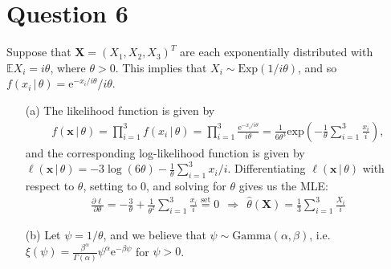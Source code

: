 \documentclass[10pt]{article}
\begin{document}
\section{Question 6} \noindent
Suppose that \(\bm{X} = (X_1, X_2, X_3)^T\) are each exponentially distributed with \(\mathbb{E}X_i = i\theta\), where \(\theta > 0\). This implies that 
\(X_i \sim \mathrm{Exp}(1 / i\theta)\), and so \(f(x_i \,|\, \theta) = \mathrm{e}^{-x_i / i\theta} / i\theta\). 
\begin{itemize}
    \item[(a)] The likelihood function is given by 
    \begin{align*}
        f(\mathbf{x} \,|\, \theta)
        = \prod_{i=1}^3 f(x_i \,|\, \theta)
        = \prod_{i=1}^3 \frac{\mathrm{e}^{-x_i / i\theta}}{i \theta}
        = \frac{1}{6 \theta^3} \mathrm{exp} \left( - \frac{1}{\theta} \sum_{i=1}^3 \frac{x_i}{i} \right),
    \end{align*}
    and the corresponding log-likelihood function is given by 
    \(\ell(\mathbf{x} \,|\, \theta) = -3 \log (6 \theta) - \frac{1}{\theta} \sum_{i=1}^3 x_i / i.\)
    Differentiating \(\ell(\mathbf{x} \,|\, \theta)\) with respect to \(\theta\), setting to 0, and solving for \(\theta\) gives us the MLE:
    \begin{align*}
        \frac{\partial \ell}{\partial \theta}  
        = - \frac{3}{\theta} + \frac{1}{\theta^2} \sum_{i=1}^3 \frac{x_i}{i} 
        \overset{\text{set}}{=} 0
        ~~\Longrightarrow~~
        \hat{\theta}(\bm{X}) = \frac{1}{3} \sum_{i=1}^3 \frac{X_i}{i}
    \end{align*}
    \item[(b)] Let \(\psi = 1 / \theta\), and we believe that \(\psi \sim \mathrm{Gamma}(\alpha, \beta)\), i.e. 
    \(\xi(\psi) = \frac{\beta^{\alpha}}{\Gamma(\alpha)} \psi^{\alpha} \mathrm{e}^{-\beta \psi}\) for \(\psi > 0\). 

\end{itemize}
\end{document}
